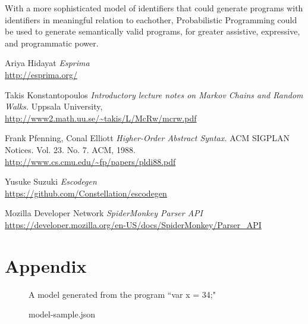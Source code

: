 \documentclass{article}
\begin{document}
With a more sophisticated model of identifiers that could generate programs with
identifiers in meaningful relation to eachother, Probabilistic Programming could
be used to generate semantically valid programs, for greater assistive,
expressive, and programmatic power.

\begin{thebibliography}{1}

	 Ariya Hidayat {\em Esprima}
		\\\url{http://esprima.org/}

	 Takis Konstantopoulos {\em Introductory lecture notes on
		Markov Chains and Random Walks.} Uppsala University,
		\\\url{http://www2.math.uu.se/~takis/L/McRw/mcrw.pdf}

	 Frank Pfenning, Conal Elliott
		{\em Higher-Order Abstract Syntax.}
		ACM SIGPLAN Notices. Vol. 23. No. 7. ACM, 1988.
		\\\url{http://www.cs.cmu.edu/~fp/papers/pldi88.pdf}

	 Yusuke Suzuki {\em Escodegen}
		\\\url{https://github.com/Constellation/escodegen}

	 Mozilla Developer Network {\em SpiderMonkey Parser API}
		\\\url{https://developer.mozilla.org/en-US/docs/SpiderMonkey/Parser_API}

\end{thebibliography}

\clearpage
\section*{Appendix}

\begin{figure}[h!]
	\caption{model-sample.json}
	\label{fig:sample-model}
	\centering
	A model generated from the program ``var x = 34;"
\end{figure}


\end{document}
